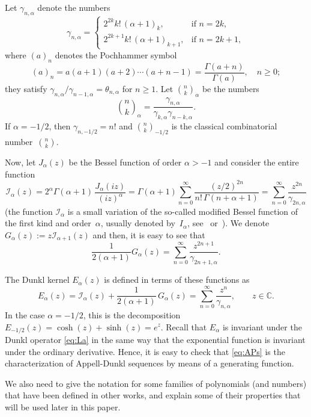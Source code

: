 \documentclass[11pt]{article}
\theoremstyle{plain}
\theoremstyle{remark}
\numberwithin{equation}{section} %
\newcommand{\Ea}{E_{\alpha}}
\newcommand{\binoma}[2]{\binom{#1}{#2}_{\!\alpha}}
\newcommand{\I}{\mathcal{I}}
\newcommand{\CC}{\mathbb{C}}
\begin{document}
Let $\gamma_{n,\alpha}$ denote the numbers
\begin{equation*}
  \gamma_{n,\alpha} =
  \begin{cases}
    2^{2k}k!\,(\alpha+1)_k, & \text{if $n=2k$},\\
    2^{2k+1}k!\,(\alpha+1)_{k+1}, & \text{if $n=2k+1$},
  \end{cases}
\end{equation*}
where $(a)_n$ denotes the Pochhammer symbol
\[
  (a)_n = a(a+1)(a+2) \cdots (a+n-1) = \frac{\Gamma(a+n)}{\Gamma(a)},
  \quad n \ge 0;
\]
they satisfy $\gamma_{n,\alpha}/\gamma_{n-1,\alpha} = \theta_{n,\alpha}$ for $n \ge 1$. Let $\binoma{n}{k}$ be the numbers
\[
  \binoma{n}{k} = \frac{\gamma_{n,\alpha}}{\gamma_{k,\alpha}\gamma_{n-k,\alpha}}.
\]
If $\alpha=-1/2$, then $\gamma_{n,-1/2}=n!$ and $\binom{n}{k}_{-1/2}$ is the classical combinatorial number~$\binom{n}{k}$.

Now, let $J_{\alpha}(z)$ be the Bessel function of order $\alpha>-1$ and consider the entire function
\[
  \I_\alpha(z)
  = 2^\alpha \Gamma(\alpha+1)\, \frac{J_\alpha(iz)}{(iz)^\alpha}
  = \Gamma(\alpha+1) \sum_{n=0}^\infty \frac{(z/2)^{2n}}{n!\,\Gamma(n+\alpha+1)}
  = \sum_{n=0}^{\infty} \frac{z^{2n}}{\gamma_{2n,\alpha}} 
\]
(the function $\I_\alpha$ is a small variation of the so-called modified Bessel function of the first kind and order~$\alpha$, usually denoted by~$I_\alpha$, see~\cite{Wat} or~\cite{OlMa-NIST}). We denote $G_{\alpha}(z) := z\I_{\alpha+1}(z)$ and then, it is easy to see that
\[
  \frac{1}{2(\alpha+1)}G_{\alpha}(z) = \sum_{n=0}^{\infty} \frac{z^{2n+1}}{\gamma_{2n+1,\alpha}}.
\]

The Dunkl kernel $\Ea(z)$ is defined in terms of these functions as
\[
  \Ea(z) = \I_\alpha(z) + \frac{1}{2(\alpha+1)}\, G_{\alpha}(z)
  = \sum_{n=0}^\infty \frac{z^n}{\gamma_{n,\alpha}},
  \qquad z \in \CC.
\]
In the case $\alpha=-1/2$, this is the decomposition $E_{-1/2}(z) = \cosh(z) + \sinh(z) = e^{z}$. Recall that $\Ea$ is invariant under the Dunkl operator \eqref{eq:La}
in the same way that the exponential function is invariant under the ordinary derivative.
Hence, it is easy to check that \eqref{eq:APs} is the characterization of Appell-Dunkl sequences
by means of a generating function.

We also need to give the notation for some families of polynomials (and numbers) that have been defined in other works, and explain some of their properties that will be used later in this paper.
\end{document}
